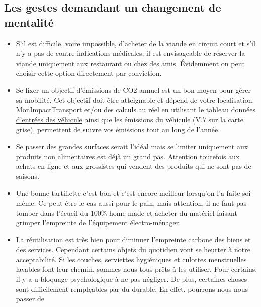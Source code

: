 \hypertarget{les-gestes-demandant-un-changement-de-mentalituxe9}{%
\subsection{Les gestes demandant un changement de
mentalité}\label{les-gestes-demandant-un-changement-de-mentalituxe9}}

\begin{itemize}
\tightlist
\item
  S'il est difficile, voire impossible, d'acheter de la viande en
  circuit court et s'il n'y a pas de contre indications médicales, il
  est envisageable de réserver la viande uniquement aux restaurant ou
  chez des amis. Évidemment on peut choisir cette option directement par
  conviction.\\
\item
  Se fixer un objectif d'émissions de CO2 annuel est un bon moyen pour
  gérer sa mobilité. Cet objectif doit être atteignable et dépend de
  votre localisation.
  \href{https://monimpacttransport.fr/}{MonImpactTransport} et/ou des
  calculs au réel en utilisant le \protect\hyperlink{et-lhumain}{tableau
  données d'entrées des véhicule} ainsi que les émissions du véhicule
  (V.7 sur la carte grise), permettent de suivre vos émissions tout au
  long de l'année.\\
\item
  Se passer des grandes surfaces serait l'idéal mais se limiter
  uniquement aux produits non alimentaires est déjà un grand pas.
  Attention toutefois aux achats en ligne et aux grossistes qui vendent
  des produits qui ne sont pas de saisons.\\
\item
  Une bonne tartiflette c'est bon et c'est encore meilleur lorsqu'on l'a
  faite soi-même. Ce peut-être le cas aussi pour le pain, mais
  attention, il ne faut pas tomber dans l'écueil du 100\% home made et
  acheter du matériel faisant grimper l'empreinte de l'équipement
  électro-ménager.\\
\item
  La réutilisation est très bien pour diminuer l'empreinte carbone des
  biens et des services. Cependant certains objets du quotidien vont se
  heurter à notre acceptabilité. Si les couches, serviettes hygiéniques
  et culottes menstruelles lavables font leur chemin, sommes nous tous
  prêts à les utiliser. Pour certains, il y a u bloquage psychologique à
  ne pas négliger. De plus, certaines choses sont difficilement
  remplçables par du durable. En effet, pourrons-nous nous passer de

\end{itemize}
